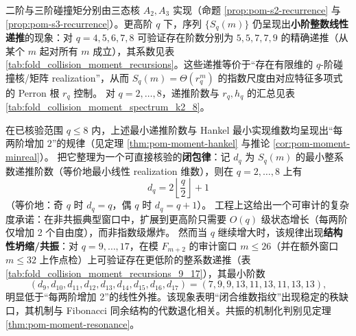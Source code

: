 \begin{remark}\label{rem:pom-moment-rec}
二阶与三阶碰撞矩分别由三态核 \(A_2,A_3\) 实现（命题 \ref{prop:pom-s2-recurrence} 与 \ref{prop:pom-s3-recurrence}）。更高阶 \(q\) 下，序列 \(\{S_q(m)\}\) 仍呈现出\textbf{小阶整数线性递推}的现象：对 \(q=4,5,6,7,8\) 可验证存在阶数分别为 \(5,5,7,7,9\) 的精确递推（从某个 \(m\) 起对所有 \(m\) 成立），其系数见表 \ref{tab:fold_collision_moment_recursions}。这些递推等价于“存在有限维的 \(q\)-阶碰撞核/矩阵 realization”，从而 \(S_q(m)=\Theta(r_q^m)\) 的指数尺度由对应特征多项式的 Perron 根 \(r_q\) 控制。
对 \(q=2,\dots,8\)，递推阶数与 \(r_q,h_q\) 的汇总见表 \ref{tab:fold_collision_moment_spectrum_k2_8}。


在已核验范围 \(q\le 8\) 内，上述最小递推阶数与 Hankel 最小实现维数均呈现出“每两阶增加 \(2\)”的规律（见定理 \ref{thm:pom-moment-hankel} 与推论 \ref{cor:pom-moment-minreal}）。
把它整理为一个可直接核验的\textbf{闭包律}：记 \(d_q\) 为 \(S_q(m)\) 的最小整系数递推阶数（等价地最小线性 realization 维数），则在 \(q=2,\dots,8\) 上有
\[
\boxed{\;
d_q = 2\left\lfloor \frac{q}{2}\right\rfloor+1\;}
\]
（等价地：奇 \(q\) 时 \(d_q=q\)，偶 \(q\) 时 \(d_q=q+1\)）。
工程上这给出一个可审计的复杂度承诺：在非共振典型窗口中，扩展到更高阶只需要 \(O(q)\) 级状态增长（每两阶仅增加 2 个自由度），而非指数级爆炸。
然而当 \(q\) 继续增大时，该规律出现\textbf{结构性坍缩/共振}：对 \(q=9,\dots,17\)，在模 \(F_{m+2}\) 的审计窗口 \(m\le 26\)（并在额外窗口 \(m\le 32\) 上作点检）上可验证存在更低阶的整系数递推（表 \ref{tab:fold_collision_moment_recursions_9_17}），其最小阶数
\[
(d_9,d_{10},d_{11},d_{12},d_{13},d_{14},d_{15},d_{16},d_{17})=(7,9,9,13,11,13,11,13,13),
\]
明显低于“每两阶增加 2”的线性外推。该现象表明“闭合维数指纹”出现稳定的秩缺口，其机制与 Fibonacci 同余结构的代数退化相关。共振的机制化判别见定理 \ref{thm:pom-moment-resonance}。
\end{remark}

